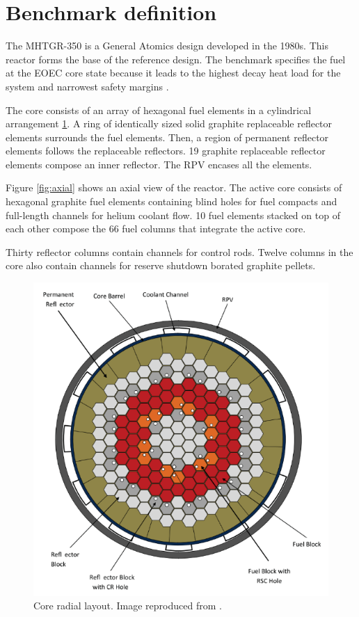 \documentclass{anstrans}
\begin{document}
\section{Benchmark definition}

The MHTGR-350 is a General Atomics design developed in the 1980s.
This reactor forms the base of the reference design.
The benchmark specifies the fuel at the \gls{EOEC} core state because it leads to the highest decay heat load for the system and narrowest safety margins \cite{ortensi_prismatic_2011}.

The core consists of an array of hexagonal fuel elements in a cylindrical arrangement \ref{fig:radial}.
A ring of identically sized solid graphite replaceable reflector elements surrounds the fuel elements.
Then, a region of permanent reflector elements follows the replaceable reflectors.
19 graphite replaceable reflector elements compose an inner reflector.
The RPV encases all the elements.

Figure \ref{fig:axial} shows an axial view of the reactor.
The active core consists of hexagonal graphite fuel elements containing blind holes for fuel compacts and full-length channels for helium coolant flow.
10 fuel elements stacked on top of each other compose the 66 fuel columns that integrate the active core.

Thirty reflector columns contain channels for control rods.
Twelve columns in the core also contain channels for reserve shutdown borated graphite pellets.

\begin{figure}[htbp!] %
	\centering
	\includegraphics[width=0.95\linewidth]{figures/radial-layout.png}
	\hfill
	\caption{Core radial layout. Image reproduced from \cite{oecd_nea_benchmark_2017}.}
	\label{fig:radial}
\end{figure}
\end{document}
